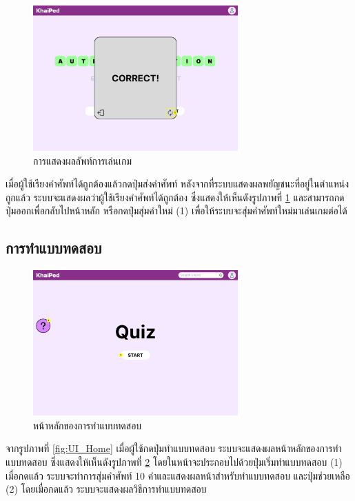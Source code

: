 \documentclass[12pt,oneside,openright,a4paper]{cpe-thai-project}
\begin{document}
\begin{figure}[!h]\centering
	\includegraphics[width=0.7\textwidth, keepaspectratio=true]{image/chap3/ui/game/Word Scramble - Pop Up.png}
	\caption{การแสดงผลลัพท์การเล่นเกม}\label{fig:UI_GameResult}
\end{figure}
\hspace{1cm}
เมื่อผู้ใช้เรียงคำศัพท์ได้ถูกต้องแล้วกดปุ่มส่งคำศัพท์ หลังจากที่ระบบแสดงผลพยัญชนะที่อยู่ในตำแหน่งถูกแล้ว ระบบจะแสดงผลว่าผู้ใช้เรียงคำศัพท์ได้ถูกต้อง
ซึ่งแสดงให้เห็นดังรูปภาพที่ \ref{fig:UI_GameResult}
และสามารถกดปุ่มออกเพื่อกลับไปหน้าหลัก หรือกดปุ่มสุ่มคำใหม่ (1) เพื่อให้ระบบจะสุ่มคำศัพท์ใหม่มาเล่นเกมต่อได้

\pagebreak
\subsection{การทำแบบทดสอบ}
\begin{figure}[!h]\centering
	\includegraphics[width=0.7\textwidth, keepaspectratio=true]{image/chap3/ui/quiz/Quiz.png}
	\caption{หน้าหลักของการทำแบบทดสอบ}\label{fig:UI_Quiz}
\end{figure}
\hspace{1cm}
จากรูปภาพที่ \ref{fig:UI_Home} เมื่อผู้ใช้กดปุ่มทำแบบทดสอบ ระบบจะแสดงผลหน้าหลักของการทำแบบทดสอบ ซึ่งแสดงให้เห็นดังรูปภาพที่ \ref{fig:UI_Quiz}
โดยในหน้าจะประกอบไปด้วยปุ่มเริ่มทำแบบทดสอบ (1) เมื่อกดแล้ว ระบบจะทำการสุ่มคำศัพท์ 10 คำและแสดงผลหน้าสำหรับทำแบบทดสอบ
และปุ่มช่วยเหลือ (2) โดยเมื่อกดแล้ว ระบบจะแสดงผลวิธีการทำแบบทดสอบ
\end{document}
